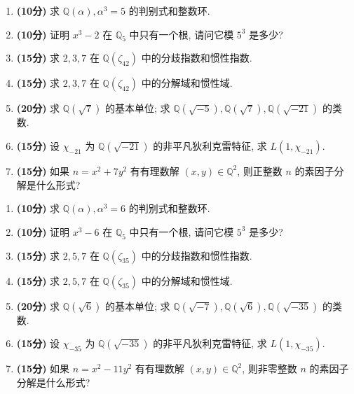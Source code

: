 \documentclass[simple]{hfutexam}
\newcommand{\BQ}{\mathbb{Q}}
\begin{document}
\maketitle

\begin{enumerate}
\item \textbf{(10分)} 求 $\BQ(\alpha),\alpha^3=5$ 的判别式和整数环. 
\item \textbf{(10分)} 证明 $x^3-2$ 在 $\BQ_5$ 中只有一个根, 请问它模 $5^3$ 是多少? 
\item \textbf{(15分)} 求 $2,3,7$ 在 $\BQ(\zeta_{42})$ 中的分歧指数和惯性指数.
\item \textbf{(15分)} 求 $2,3,7$ 在 $\BQ(\zeta_{42})$ 中的分解域和惯性域.
\item \textbf{(20分)} 求 $\BQ(\sqrt{7})$ 的基本单位; 求 $\BQ(\sqrt{-5}),\BQ(\sqrt{7}),\BQ(\sqrt{-21})$ 的类数.
\item \textbf{(15分)} 设 $\chi_{-21}$ 为 $\BQ(\sqrt{-21})$ 的非平凡狄利克雷特征, 求 $L(1,\chi_{-21}).$
\item \textbf{(15分)} 如果 $n=x^2+7y^2$ 有有理数解 $(x,y)\in\BQ^2$, 则正整数 $n$ 的素因子分解是什么形式?
\end{enumerate}
\newpage

\maketitle

\begin{enumerate}
\item \textbf{(10分)} 求 $\BQ(\alpha),\alpha^3=6$ 的判别式和整数环. 
\item \textbf{(10分)} 证明 $x^3-6$ 在 $\BQ_5$ 中只有一个根, 请问它模 $5^3$ 是多少? 
\item \textbf{(15分)} 求 $2,5,7$ 在 $\BQ(\zeta_{35})$ 中的分歧指数和惯性指数.
\item \textbf{(15分)} 求 $2,5,7$ 在 $\BQ(\zeta_{35})$ 中的分解域和惯性域.
\item \textbf{(20分)} 求 $\BQ(\sqrt{6})$ 的基本单位; 求 $\BQ(\sqrt{-7}),\BQ(\sqrt{6}),\BQ(\sqrt{-35})$ 的类数.
\item \textbf{(15分)} 设 $\chi_{-35}$ 为 $\BQ(\sqrt{-35})$ 的非平凡狄利克雷特征, 求 $L(1,\chi_{-35}).$
\item \textbf{(15分)} 如果 $n=x^2-11y^2$ 有有理数解 $(x,y)\in\BQ^2$, 则非零整数 $n$ 的素因子分解是什么形式? 
\end{enumerate}
\end{document}
